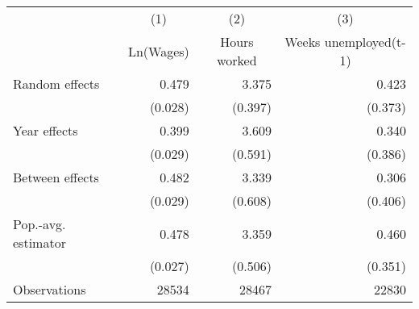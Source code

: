 \begin{tabular}{l*{3}{r}} \toprule
                    &\multicolumn{1}{c}{(1)}&\multicolumn{1}{c}{(2)}&\multicolumn{1}{c}{(3)}\\
                    &\multicolumn{1}{c}{Ln(Wages)}&\multicolumn{1}{c}{Hours worked}&\multicolumn{1}{c}{Weeks unemployed(t-1)}\\
\midrule
Random effects      &       0.479\sym{***}&       3.375\sym{***}&       0.423         \\
                    &     (0.028)         &     (0.397)         &     (0.373)         \\
\addlinespace
Year effects        &       0.399\sym{***}&       3.609\sym{***}&       0.340         \\
                    &     (0.029)         &     (0.591)         &     (0.386)         \\
\addlinespace
Between effects     &       0.482\sym{***}&       3.339\sym{***}&       0.306         \\
                    &     (0.029)         &     (0.608)         &     (0.406)         \\
\addlinespace
Pop.-avg. estimator &       0.478\sym{***}&       3.359\sym{***}&       0.460         \\
                    &     (0.027)         &     (0.506)         &     (0.351)         \\\bottomrule
\addlinespace
Observations        &       28534         &       28467         &       22830         \\
\bottomrule \end{tabular}
